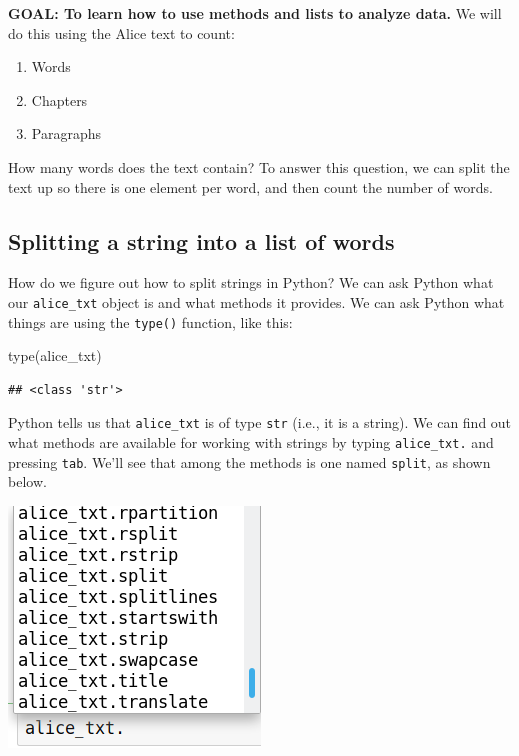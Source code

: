 \documentclass[]{book}
\newenvironment{Shaded}{\begin{snugshade}}{\end{snugshade}}
\newcommand{\BuiltInTok}[1]{#1}
\newcommand{\NormalTok}[1]{#1}
\providecommand{\tightlist}{%
  \setlength{\itemsep}{0pt}\setlength{\parskip}{0pt}}
\begin{document}
\textbf{GOAL: To learn how to use methods and lists to analyze data.} We will do this using the Alice text to count:

\begin{enumerate}
\def\labelenumi{\arabic{enumi}.}
\tightlist
\item
  Words
\item
  Chapters
\item
  Paragraphs
\end{enumerate}

How many words does the text contain? To answer this question, we can split the text up so there is one element per word, and then count the number of words.

\hypertarget{splitting-a-string-into-a-list-of-words}{%
\subsection{Splitting a string into a list of words}\label{splitting-a-string-into-a-list-of-words}}

How do we figure out how to split strings in Python? We can ask Python what our \texttt{alice\_txt} object is and what methods it provides. We can ask Python what things are using the \texttt{type()} function, like this:

\begin{Shaded}
\begin{Highlighting}[]
\BuiltInTok{type}\NormalTok{(alice_txt)}
\end{Highlighting}
\end{Shaded}

\begin{verbatim}
## <class 'str'>
\end{verbatim}

Python tells us that \texttt{alice\_txt} is of type \texttt{str} (i.e., it is a string). We can find out what methods are available for working with strings by typing \texttt{alice\_txt.} and pressing \texttt{tab}. We'll see that among the methods is one named \texttt{split}, as shown below.

\includegraphics{Python/PythonIntro/images/notebook_string_completion.png}
\end{document}
